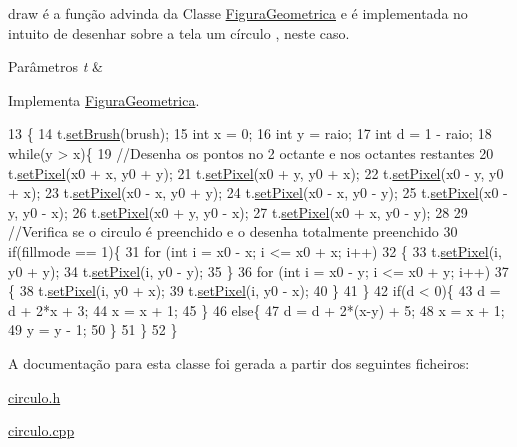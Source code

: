 draw é a função advinda da Classe \hyperlink{class_figura_geometrica}{Figura\+Geometrica} e é implementada no intuito de desenhar sobre a tela um círculo , neste caso. 


\begin{DoxyParams}{Parâmetros}
{\em t} & \\
\hline
\end{DoxyParams}


Implementa \hyperlink{class_figura_geometrica_a06404670d06d28d12f5f386901186925}{Figura\+Geometrica}.


\begin{DoxyCode}
13                            \{
14     t.\hyperlink{class_screen_aebc4eb6cb5acf15a0f04c1494622ab23}{setBrush}(brush);
15     \textcolor{keywordtype}{int} x = 0;
16     \textcolor{keywordtype}{int} y = raio;
17     \textcolor{keywordtype}{int} d = 1 - raio;
18     \textcolor{keywordflow}{while}(y > x)\{
19         \textcolor{comment}{//Desenha os pontos no 2 octante e nos octantes restantes}
20         t.\hyperlink{class_screen_ae6bea81c57a22d226507c3c26fa95ee0}{setPixel}(x0 + x, y0 + y);
21         t.\hyperlink{class_screen_ae6bea81c57a22d226507c3c26fa95ee0}{setPixel}(x0 + y, y0 + x);
22         t.\hyperlink{class_screen_ae6bea81c57a22d226507c3c26fa95ee0}{setPixel}(x0 - y, y0 + x);
23         t.\hyperlink{class_screen_ae6bea81c57a22d226507c3c26fa95ee0}{setPixel}(x0 - x, y0 + y);
24         t.\hyperlink{class_screen_ae6bea81c57a22d226507c3c26fa95ee0}{setPixel}(x0 - x, y0 - y);
25         t.\hyperlink{class_screen_ae6bea81c57a22d226507c3c26fa95ee0}{setPixel}(x0 - y, y0 - x);
26         t.\hyperlink{class_screen_ae6bea81c57a22d226507c3c26fa95ee0}{setPixel}(x0 + y, y0 - x);
27         t.\hyperlink{class_screen_ae6bea81c57a22d226507c3c26fa95ee0}{setPixel}(x0 + x, y0 - y);
28 
29         \textcolor{comment}{//Verifica se o circulo é preenchido e o desenha totalmente preenchido}
30         \textcolor{keywordflow}{if}(fillmode == 1)\{
31             \textcolor{keywordflow}{for} (\textcolor{keywordtype}{int} i = x0 - x; i <= x0 + x; i++)
32             \{
33                 t.\hyperlink{class_screen_ae6bea81c57a22d226507c3c26fa95ee0}{setPixel}(i, y0 + y);
34                 t.\hyperlink{class_screen_ae6bea81c57a22d226507c3c26fa95ee0}{setPixel}(i, y0 - y);
35             \}
36             \textcolor{keywordflow}{for} (\textcolor{keywordtype}{int} i = x0 - y; i <= x0 + y; i++)
37             \{
38                 t.\hyperlink{class_screen_ae6bea81c57a22d226507c3c26fa95ee0}{setPixel}(i, y0 + x);
39                 t.\hyperlink{class_screen_ae6bea81c57a22d226507c3c26fa95ee0}{setPixel}(i, y0 - x);
40             \}
41         \}
42         \textcolor{keywordflow}{if}(d < 0)\{
43             d = d + 2*x + 3;
44             x = x + 1;
45         \}
46         \textcolor{keywordflow}{else}\{
47             d = d + 2*(x-y) + 5;
48             x = x + 1;
49             y = y - 1;
50         \}
51     \}
52 \}
\end{DoxyCode}


A documentação para esta classe foi gerada a partir dos seguintes ficheiros\+:\begin{DoxyCompactItemize}
\item 
\hyperlink{circulo_8h}{circulo.\+h}\item 
\hyperlink{circulo_8cpp}{circulo.\+cpp}\end{DoxyCompactItemize}
